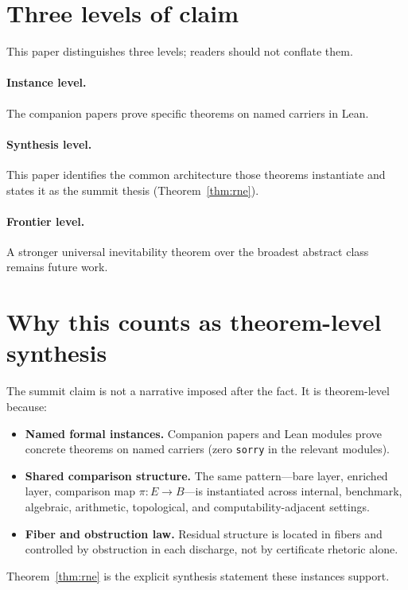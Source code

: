 \documentclass[11pt]{article}
\begin{document}
\section{Three levels of claim}\label{sec:levels}

This paper distinguishes three levels; readers should not conflate them.

\paragraph{Instance level.}
The companion papers prove specific theorems on named carriers in Lean.

\paragraph{Synthesis level.}
This paper identifies the common architecture those theorems instantiate and states
it as the summit thesis (Theorem~\ref{thm:rne}).

\paragraph{Frontier level.}
A stronger universal inevitability theorem over the broadest abstract class remains
future work.

\section{Why this counts as theorem-level synthesis}\label{sec:theorem-synthesis}

The summit claim is not a narrative imposed after the fact. It is theorem-level
because:
\begin{itemize}
  \item \textbf{Named formal instances.} Companion papers and Lean modules prove
    concrete theorems on named carriers (zero \texttt{sorry} in the relevant
    modules).
  \item \textbf{Shared comparison structure.} The same pattern---bare layer, enriched
    layer, comparison map $\pi : E \to B$---is instantiated across internal, benchmark,
    algebraic, arithmetic, topological, and computability-adjacent settings.
  \item \textbf{Fiber and obstruction law.} Residual structure is located in fibers
    and controlled by obstruction in each discharge, not by certificate rhetoric
    alone.
\end{itemize}
Theorem~\ref{thm:rne} is the explicit synthesis statement these instances support.
\end{document}
